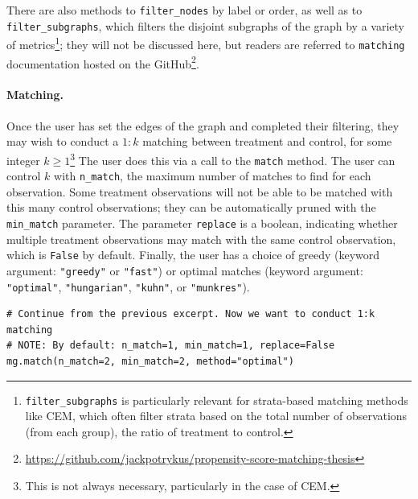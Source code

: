 \documentclass[11pt]{extarticle}
\begin{document}
There are also methods to \texttt{filter\_nodes} by label or order, as well as to \texttt{filter\_subgraphs}, which filters the disjoint subgraphs of the graph by a variety of metrics\footnote{\texttt{filter\_subgraphs} is particularly relevant for strata-based matching methods like CEM, which often filter strata based on the total number of observations (from each group), the ratio of treatment to control.}; they will not be discussed here, but readers are referred to \texttt{matching} documentation hosted on the GitHub\footnote{\url{https://github.com/jackpotrykus/propensity-score-matching-thesis}}.

\paragraph{Matching.} Once the user has set the edges of the graph and completed their filtering, they may wish to conduct a $1:k$ matching between treatment and control, for some integer $k \geq 1$\footnote{This is not always necessary, particularly in the case of CEM.}
The user does this via a call to the \texttt{match} method. The user can control $k$ with \texttt{n\_match}, the maximum number of matches to find for each observation. Some treatment observations will not be able to be matched with this many control observations; they can be automatically pruned with the \texttt{min\_match} parameter. The parameter \texttt{replace} is a boolean, indicating whether multiple treatment observations may match with the same control observation, which is \texttt{False} by default. Finally, the user has a choice of greedy (keyword argument: \texttt{"greedy"} or \texttt{"fast"}) or optimal matches (keyword argument: \texttt{"optimal"}, \texttt{"hungarian"}, \texttt{"kuhn"}, or \texttt{"munkres"}).
\begin{verbatim}
# Continue from the previous excerpt. Now we want to conduct 1:k matching
# NOTE: By default: n_match=1, min_match=1, replace=False
mg.match(n_match=2, min_match=2, method="optimal")
\end{verbatim}
\end{document}
